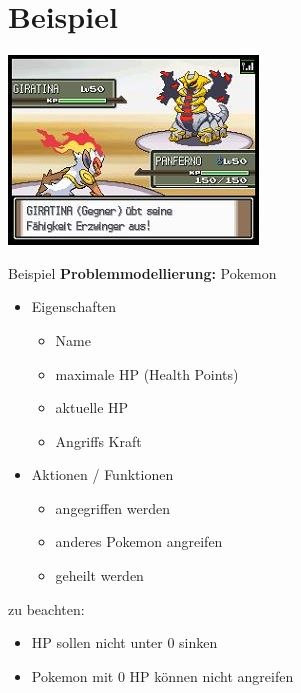 \section*{Beispiel}
\begin{frame}
	\includegraphics[width=\linewidth]{resources/05mutation_klassen/pokemon_ballte.jpeg}
\end{frame}
\begin{frame}{Beispiel}
	\textbf{Problemmodellierung:}
	Pokemon
	\begin{itemize}
		\item Eigenschaften
		\begin{itemize}
			\item Name
			\item maximale HP (Health Points)
			\item aktuelle HP
			\item Angriffs Kraft
		\end{itemize}
		\item Aktionen / Funktionen
		\begin{itemize}
			\item angegriffen werden
			\item anderes Pokemon angreifen
			\item geheilt werden
		\end{itemize}
	\end{itemize}
	zu beachten:
	\begin{itemize}
		\item HP sollen nicht unter 0 sinken
		\item Pokemon mit 0 HP können nicht angreifen
	\end{itemize}

\end{frame}

